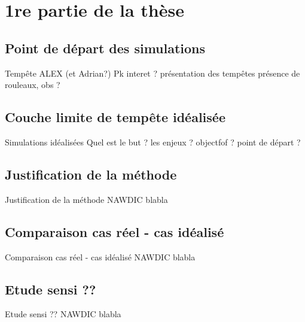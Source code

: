 \section{1re partie de la thèse}

\subsection{Point de départ des simulations}
\begin{frame}{Tempête ALEX (et Adrian?)}
Pk interet ? 
présentation des tempêtes 
présence de rouleaux, obs ? 
\end{frame}

\subsection{Couche limite de tempête idéalisée}
\begin{frame}{Simulations idéalisées}
Quel est le but ? 
les enjeux ? 
objectfof ? 
point de départ ? 
\end{frame}

\subsection{Justification de la méthode}
\begin{frame}{Justification de la méthode}
	NAWDIC blabla
\end{frame}

\subsection{Comparaison cas réel - cas idéalisé}
\begin{frame}{Comparaison cas réel - cas idéalisé}
	NAWDIC blabla
\end{frame}

\subsection{Etude sensi ??}
\begin{frame}{Etude sensi ??}
	NAWDIC blabla
\end{frame}


